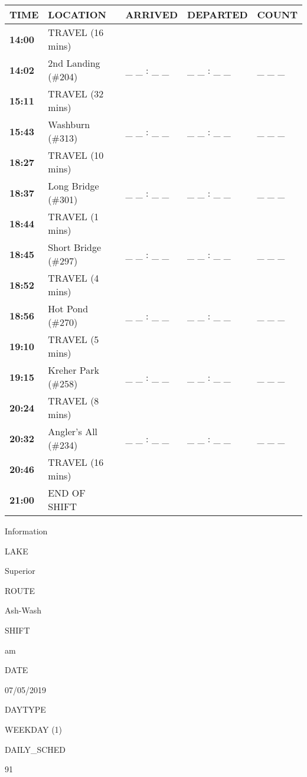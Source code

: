 \documentclass[]{article}
\begin{document}
\begin{tabular}{>{\bfseries}lllll}
\toprule
\textbf{TIME} & \textbf{LOCATION} & \textbf{ARRIVED} & \textbf{DEPARTED} & \textbf{COUNT}\\
\midrule
14:00 & TRAVEL (16 mins) &  &  & \\
14:02 & 2nd Landing (\#204) & \_ \_ : \_ \_ & \_ \_ : \_ \_ & \_ \_ \_\\
15:11 & TRAVEL (32 mins) &  &  & \\
15:43 & Washburn (\#313) & \_ \_ : \_ \_ & \_ \_ : \_ \_ & \_ \_ \_\\
18:27 & TRAVEL (10 mins) &  &  & \\
18:37 & Long Bridge (\#301) & \_ \_ : \_ \_ & \_ \_ : \_ \_ & \_ \_ \_\\
18:44 & TRAVEL (1 mins) &  &  & \\
18:45 & Short Bridge (\#297) & \_ \_ : \_ \_ & \_ \_ : \_ \_ & \_ \_ \_\\
18:52 & TRAVEL (4 mins) &  &  & \\
18:56 & Hot Pond (\#270) & \_ \_ : \_ \_ & \_ \_ : \_ \_ & \_ \_ \_\\
19:10 & TRAVEL (5 mins) &  &  & \\
19:15 & Kreher Park (\#258) & \_ \_ : \_ \_ & \_ \_ : \_ \_ & \_ \_ \_\\
20:24 & TRAVEL (8 mins) &  &  & \\
20:32 & Angler's All (\#234) & \_ \_ : \_ \_ & \_ \_ : \_ \_ & \_ \_ \_\\
20:46 & TRAVEL (16 mins) &  &  & \\
21:00 & END OF SHIFT &  &  & \\
\bottomrule
\end{tabular}\newpage

Information

LAKE

Superior

ROUTE

Ash-Wash

SHIFT

am

DATE

07/05/2019

DAYTYPE

WEEKDAY (1)

DAILY\_SCHED

91

\vspace{24pt}
\end{document}
